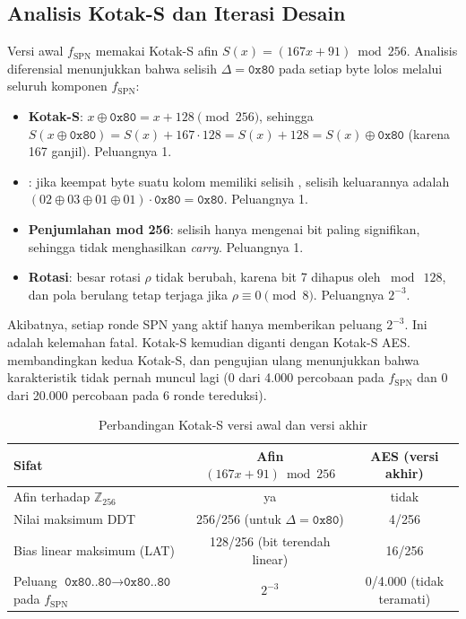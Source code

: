 \subsection{Analisis Kotak-S dan Iterasi Desain}
\label{sec:iterasi-sbox}
Versi awal $f_{\text{SPN}}$ memakai Kotak-S afin $S(x) = (167x + 91) \bmod 256$. Analisis diferensial menunjukkan bahwa selisih $\Delta = \texttt{0x80}$ pada setiap byte lolos melalui seluruh komponen $f_{\text{SPN}}$:
\begin{itemize}
    \item \textbf{Kotak-S}: $x \oplus \texttt{0x80} = x + 128 \pmod{256}$, sehingga $S(x \oplus \texttt{0x80}) = S(x) + 167 \cdot 128 = S(x) + 128 = S(x) \oplus \texttt{0x80}$ (karena 167 ganjil). Peluangnya 1.
    \item \textbf{}: jika keempat byte suatu kolom memiliki selisih , selisih keluarannya adalah $(02 \oplus 03 \oplus 01 \oplus 01) \cdot \texttt{0x80} = \texttt{0x80}$. Peluangnya 1.
    \item \textbf{Penjumlahan mod 256}: selisih  hanya mengenai bit paling signifikan, sehingga tidak menghasilkan \textit{carry}. Peluangnya 1.
    \item \textbf{Rotasi}: besar rotasi $\rho$ tidak berubah, karena bit 7 dihapus oleh $\bmod\ 128$, dan pola  berulang tetap terjaga jika $\rho \equiv 0 \pmod 8$. Peluangnya $2^{-3}$.
\end{itemize}
Akibatnya, setiap ronde SPN yang aktif hanya memberikan peluang $2^{-3}$. Ini adalah kelemahan fatal. Kotak-S kemudian diganti dengan Kotak-S AES.  membandingkan kedua Kotak-S, dan pengujian ulang menunjukkan bahwa karakteristik  tidak pernah muncul lagi (0 dari 4.000 percobaan pada $f_{\text{SPN}}$ dan 0 dari 20.000 percobaan pada 6 ronde tereduksi).

\begin{table}[H]
    \centering
    \caption{Perbandingan Kotak-S versi awal dan versi akhir}
    \label{tab:sbox-analisis}
    \small
    \begin{tabularx}{\textwidth}{Y c c}
        \toprule
        \textbf{Sifat} & \textbf{Afin $(167x+91) \bmod 256$} & \textbf{AES (versi akhir)} \\
        \midrule
        Afin terhadap $\mathbb{Z}_{256}$ & ya & tidak \\
        Nilai maksimum DDT & 256/256 (untuk $\Delta = \texttt{0x80}$) & 4/256 \\
        Bias linear maksimum (LAT) & 128/256 (bit terendah linear) & 16/256 \\
        Peluang $\texttt{0x80..80} \to \texttt{0x80..80}$ pada $f_{\text{SPN}}$ & $2^{-3}$ & 0/4.000 (tidak teramati) \\
        \bottomrule
    \end{tabularx}
\end{table}

